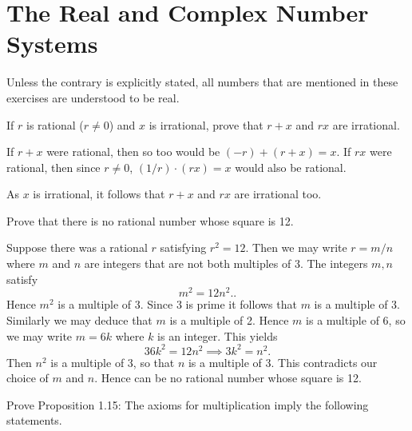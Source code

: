 \section{The Real and Complex Number Systems}

Unless the contrary is explicitly stated, all numbers that are mentioned in these exercises are understood to be real.

\begin{questions}
  \question If $r$ is rational ($r\neq0$) and $x$ is irrational, prove that $r+x$ and $rx$ are irrational.
  \begin{solution}
    If $r+x$ were rational, then so too would be $(-r)+(r+x)=x$. If $rx$ were rational, then since $r\neq0$, $(1/r)\cdot(rx)=x$ would also be rational.

    As $x$ is irrational, it follows that $r+x$ and $rx$ are irrational too.
  \end{solution}

  \question Prove that there is no rational number whose square is 12.
  \begin{solution}
    Suppose there was a rational $r$ satisfying $r^2=12$. Then we may write $r=m/n$ where $m$ and $n$ are integers that are not both multiples of 3. The integers $m,n$ satisfy
    \[ m^2 = 12n^2.. \]
    Hence $m^2$ is a multiple of 3. Since 3 is prime it follows that $m$ is a multiple of 3. Similarly we may deduce that $m$ is a multiple of 2. Hence $m$ is a multiple of 6, so we may write $m=6k$ where $k$ is an integer. This yields
    \[ 36k^2 = 12n^2 \implies 3k^2 = n^2. \]
    Then $n^2$ is a multiple of 3, so that $n$ is a multiple of 3. This contradicts our choice of $m$ and $n$. Hence can be no rational number whose square is 12.
  \end{solution}

  \question Prove Proposition 1.15: The axioms for multiplication imply the following statements.
\end{questions}
